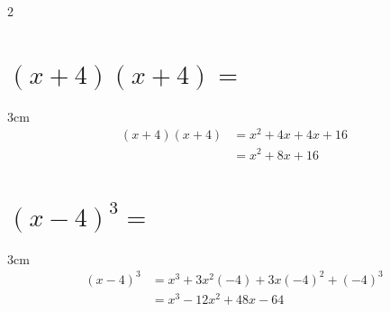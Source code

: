 \documentclass[12pt,addpoints,answers]{evalua}
\begin{document}
\begin{questions}
\begin{multicols}{2}
\begin{parts}

            \part {\Large $(x+4)(x+4)=$}

            \begin{solutionbox}{3cm}\large
                \begin{align*}
                    (x+4)(x+4) & = x^2+4x+4x+16 \\
                               & = x^2+8x+16
                \end{align*}
            \end{solutionbox}



            \part {\Large $(x-4)^3=$}

            \begin{solutionbox}{3cm}\normalsize
                \begin{align*}
                    (x-4)^3 & = x^3+3x^2(-4)+3x(-4)^2+(-4)^3 \\
                            & = x^3-12x^2+48x-64
                \end{align*}
            \end{solutionbox}



\end{parts}
\end{multicols}
\end{questions}
\end{document}
